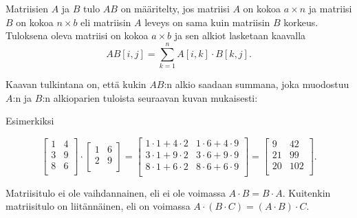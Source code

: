
Matriisien $A$ ja $B$ tulo $AB$ on määritelty,
jos matriisi $A$ on kokoa $a \times n$
ja matriisi $B$ on kokoa $n \times b$
eli matriisin $A$ leveys on sama kuin matriisin
$B$ korkeus.
Tuloksena oleva matriisi
on kokoa $a \times b$
ja sen alkiot lasketaan kaavalla
\[
AB[i,j] = \sum_{k=1}^n A[i,k] \cdot B[k,j].
\]

Kaavan tulkintana on, että kukin $AB$:n alkio
saadaan summana, joka muodostuu $A$:n ja
$B$:n alkioparien tuloista seuraavan
kuvan mukaisesti:

\begin{center}
\end{center}

Esimerkiksi

\[
 \begin{bmatrix}
  1 & 4 \\
  3 & 9 \\
  8 & 6 \\
 \end{bmatrix}
\cdot
 \begin{bmatrix}
  1 & 6 \\
  2 & 9 \\
 \end{bmatrix}
=
 \begin{bmatrix}
  1 \cdot 1 + 4 \cdot 2 & 1 \cdot 6 + 4 \cdot 9 \\
  3 \cdot 1 + 9 \cdot 2 & 3 \cdot 6 + 9 \cdot 9 \\
  8 \cdot 1 + 6 \cdot 2 & 8 \cdot 6 + 6 \cdot 9 \\
 \end{bmatrix}
=
 \begin{bmatrix}
  9 & 42 \\
  21 & 99 \\
  20 & 102 \\
 \end{bmatrix}.
\]

Matriisitulo ei ole vaihdannainen,
eli ei ole voimassa $A \cdot B = B \cdot A$.
Kuitenkin matriisitulo
on liitännäinen, eli on voimassa $A \cdot (B \cdot C)=(A \cdot B) \cdot C$.

